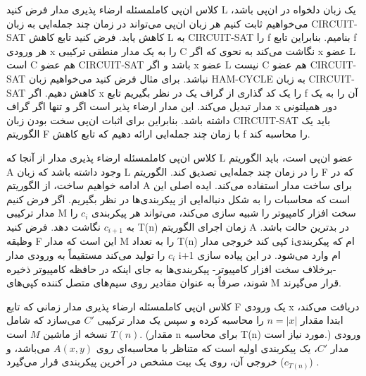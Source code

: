 \begin{itemframe-s}{کلاس ان‌پی کامل}{مسئله ارضاء پذیری مدار}
\itm
فرض کنید L یک زبان دلخواه در ان‌پی باشد، می‌خواهیم ثابت کنیم هر زبان ان‌پی می‌تواند در زمان چند جمله‌ایی به زبان CIRCUIT-SAT کاهش یابد. فرض کنید تابع کاهش L به CIRCUIT-SAT را f بنامیم.
\itm
بنابراین تابع f هر ورودی x را به یک مدار منطقی ترکیبی C نگاشت می‌کند به نحوی که اگر x عضو L است C هم عضو CIRCUIT-SAT باشد و اگر x عضو L نیست C هم عضو CIRCUIT-SAT نباشد.
\itm
برای مثال فرض کنید می‌خواهیم زبان HAM-CYCLE به زبان CIRCUIT-SAT کاهش دهیم. اگر x را یک کد گذاری از گراف یک در نظر بگیریم تابع f آن را به یک مدار تبدیل می‌کند. این مدار ارضاء پذیر است اگر و تنها اگر گراف x دور همیلتونی داشته باشد.
\itm
بنابراین برای اثبات ان‌پی سخت بودن زبان CIRCUIT-SAT باید یک الگوریتم F با زمان چند جمله‌ایی ارائه دهیم که تابع کاهش f را محاسبه کند.
\end{itemframe-s}

\begin{itemframe-s}{کلاس ان‌پی کامل}{مسئله ارضاء پذیری مدار}
\itm
از آنجا که L عضو ان‌پی است، باید الگوریتم A وجود داشته باشد که زبان L را در زمان چند جمله‌ایی تصدیق کند. الگوریتم F که در ادامه خواهیم ساخت، از الگوریتم A برای ساخت مدار استفاده می‌کند.
\itm
ایده اصلی این است که محاسبات را به شکل دنباله‌ایی از پیکربندی‌ها در نظر بگیریم. اگر فرض کنیم مدار ترکیبی M سخت افزار کامپیوتر را شبیه سازی می‌کند، می‌تواند هر پیکربندی $c_i$ را به $ c_{i+1}$ نگاشت دهد.
\itm
فرض کنید T(n) زمان اجرای الگوریتم A  در بدترین حالت باشد. وظیقه F این است که مدار M را به تعداد T(n) کپی کند خروجی مدار iام که پیکربندی $c_i$ را تولید می‌کند مستقیماً به ورودی مدار i+1 ام وارد می‌شود.
\itm
در این پیاده سازی -برخلاف سخت افزار کامپیوتر- پیکربندی‌ها به جای اینکه در حافظه کامپیوتر ذخیره شوند، صرفاً به عنوان مقادیر روی سیم‌های متصل کننده کپی‌های M قرار می‌گیرند.
\end{itemframe-s}

\begin{itemframe-s}{کلاس ان‌پی کامل}{مسئله ارضاء پذیری مدار}
\itm
زمانی که تابع F یک ورودی x دریافت می‌کند، ابتدا مقدار
 $n = |x|$
را محاسبه کرده و سپس یک مدار ترکیبی $C'$ می‌سازد که شامل $T(n)$ نسخه از ماشین $M$ است. (مقدار n برای محاسبه T(n) مورد نیاز است.)
\itm
ورودی مدار $C'$، یک پیکربندی اولیه است که متناظر با محاسبه‌ای روی $A(x, y)$ می‌باشد، و خروجی آن، روی یک بیت مشخص در آخرین پیکربندی قرار می‌گیرد ($c_{T(n)}$) .

\end{itemframe-s}

